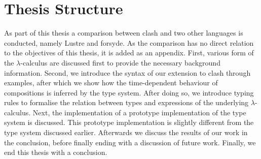 \section{Thesis Structure}
As part of this thesis a comparison between \gls{clash} and two other languages is conducted, namely Lustre\cite{halbwachs1993tutorial} and \gls{forsyde}\cite{sander2004system}.
As the comparison has no direct relation to the objectives of this thesis, it is added as an appendix.
First, various form of the $\lambda$-calculus are discussed first to provide the necessary background information.
Second, we introduce the syntax of our extension to \gls{clash} through examples, after which we show how the time-dependent behaviour of compositions is inferred by the type system.
After doing so, we introduce typing rules to formalise the relation between types and expressions of the underlying $\lambda$-calculus.
Next, the implementation of a prototype implementation of the type system is discussed. 
This prototype implementation is slightly different from the type system discussed earlier.
Afterwards we discuss the results of our work in the conclusion, before finally ending with a discussion of future work.
Finally, we end this thesis with a conclusion.


